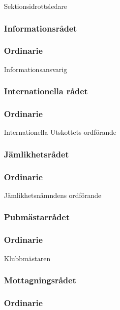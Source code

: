 \documentclass[a4paper,12pt]{article}
\begin{document}
Sektionsidrottsledare

\subsubsection{Informationsrådet}

\subsubsection{Ordinarie}

Informationsansvarig

\subsubsection{Internationella rådet}

\subsubsection{Ordinarie}

Internationella Utskottets ordförande

\subsubsection{Jämlikhetsrådet}

\subsubsection{Ordinarie}

Jämlikhetsnämndens ordförande

\subsubsection{Pubmästarrådet}

\subsubsection{Ordinarie}

Klubbmästaren

\subsubsection{Mottagningsrådet}

\subsubsection{Ordinarie}
\end{document}
